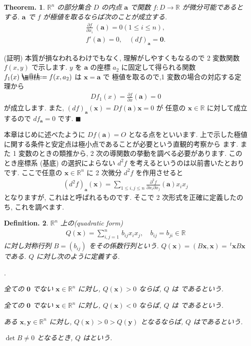 \documentclass[openany, a4paper, oneside]{jsbook}
\makeatletter
\newcounter{enum2}
\renewenvironment{enumerate}{%
\begin{list}%
{%
\arabic{enum2}.\ \,%
}%
{%
\usecounter{enum2}
\setlength{\itemindent}{0pt}%
\setlength{\leftmargin}{15pt}%
\setlength{\rightmargin}{0pt}%
\setlength{\labelsep}{0pt}%
\setlength{\labelwidth}{6pt}%
\setlength{\itemsep}{0pt}%
\setlength{\parsep}{0pt}%
\setlength{\listparindent}{0pt}%
}
}{%
\end{list}%
}
\newcommand*{\defeq}{\mathrel{\rlap{%
\raisebox{0.3ex}{$\m@th\cdot$}}%
\raisebox{-0.3ex}{$\m@th\cdot$}}%
=}
\theoremstyle{break}
\theoremstyle{breakdefn}
\newtheorem{thm}{Theorem.}[section]
\newtheorem{defn}[thm]{Definition.}
\newcommand{\bbR}{\mathbb{R}}
\makeatother
\begin{document}
\begin{thm}
$\bbR^n$ の部分集合 $D$ の内点 $\bm{a}$ で関数 $f:D\to\bbR$ が微分可能であるとする.
$\bm{a}$ で $f$ が極値を取るならば次のことが成立する.
\begin{align}
\frac{\partial f} {\partial x_i} \, (\bm{a})
=
0
(1 \leq i \leq n),\\
f'(\bm{a}) = 0,
\quad
(df) _{\bm{a}}=\bm{0}.
\end{align}
\end{thm}
(証明)
本質が損なわれるわけでもなく, 理解がしやすくもなるので 2 変数関数 $f (x,y)$ で示します.
$y$ を $\bm{a}$ の座標 $a_2$ に固定して得られる関数 $f_1 (x) \defeq f (x,a_2)$ は $\bm{x}=\bm{a}$ で
極値を取るので,1 変数の場合の対応する定理から
\begin{align}
D f_1 (x)
=
\frac{\partial f} {\partial x} ( \bm{a} )
=
0
\end{align}
が成立します. また,  $(df)_{ \bm{a} } ( \bm{x} ) = Df (\bm{a}) \bm{x} = 0$ が
任意の $\bm{x} \in \bbR$ に対して成立するので $df_{ \bm{a} } = 0$ です.  $\blacksquare$

本章はじめに述べたように $Df (\bm{a})=O$ となる点をといいます.
上で示した極値に関する条件と安定点は極小点であることが必要という直観的考察から
ます.
また 1 変数のときの類推から, 2 次の導関数の挙動を調べる必要があります.
このとき座標系 (基底) の選択によらない $d^2 f$ を考えるというのは以前書いたとおりです.
ここで任意の $\bm{x} \in \bbR^n$ に 2 次微分 $d^2f$ を作用させると
\begin{align}
(d^2 f)_{ \bm{a} } ( \bm{x} )
=
\sum_{1 \leq i ,j \leq n} \frac{ \partial^2 f} {\partial x_i \partial x_j} ( \bm{a} ) x_i  x_j
\end{align}
となりますが, これはと呼ばれるものです.
そこで 2 次形式を正確に定義したのち, これを調べます.

\begin{defn}
$\bbR^n$ 上の(quadratic form)
\begin{align}
Q ( \bm{x} )
=
\sum_{ i,j=1}^n \, b_{ij} x_i x_j , \quad b_{ij} = b_{j i} \in \bbR
\label{eq:8.11}
\end{align}
に対し対称行列 $B = ( b_{ ij } )$ をその係数行列という.
$Q ( \bm{x} ) = ( B\bm{x} , \bm{x} ) = \, ^t \bm{x} B \bm{x}$ である.
$Q$ に対し次のように定義する.
\begin{enumerate}
\item[1)] 全ての $\bm{0}$ でない $\bm{x} \in \bbR^n$ に対し,  $Q (\bm{x})>0$ ならば,  $Q$ は
であるという.
\item[2)] 全ての $\bm{0}$ でない $\bm{x} \in \bbR^n$ に対し,  $Q (\bm{x})<0$ ならば,  $Q$ は
であるという.
\item[3)] ある $\bm{x},\bm{y} \in \bbR^n$ に対し,  $Q (\bm{x}) > 0 > Q (\bm{y})$ となるならば,
$Q$ はであるという.
\item[4)] $\det B \not = 0$ となるとき,  $Q$ はという.
\end{enumerate}
\end{defn}
\end{document}

